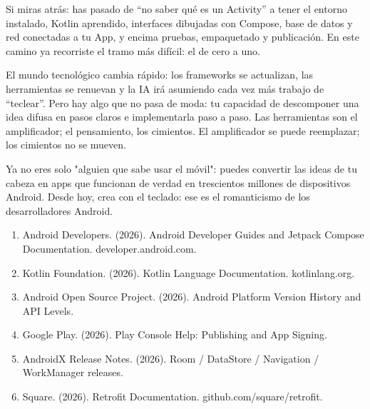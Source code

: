 Si miras atrás: has pasado de “no saber qué es un Activity” a tener el entorno instalado, Kotlin aprendido, interfaces dibujadas con Compose, base de datos y red conectadas a tu App, y encima pruebas, empaquetado y publicación. En este camino ya recorriste el tramo más difícil: el de cero a uno.

El mundo tecnológico cambia rápido: los frameworks se actualizan, las herramientas se renuevan y la IA irá asumiendo cada vez más trabajo de “teclear”. Pero hay algo que no pasa de moda: tu capacidad de descomponer una idea difusa en pasos claros e implementarla paso a paso. Las herramientas son el amplificador; el pensamiento, los cimientos. El amplificador se puede reemplazar; los cimientos no se mueven.

Ya no eres solo "alguien que sabe usar el móvil": puedes convertir las ideas de tu cabeza en apps que funcionan de verdad en trescientos millones de dispositivos Android. Desde hoy, crea con el teclado: ese es el romanticismo de los desarrolladores Android.


\begin{enumerate}
  \item Android Developers. (2026). Android Developer Guides and Jetpack Compose Documentation. developer.android.com.
  \item Kotlin Foundation. (2026). Kotlin Language Documentation. kotlinlang.org.
  \item Android Open Source Project. (2026). Android Platform Version History and API Levels.
  \item Google Play. (2026). Play Console Help: Publishing and App Signing.
  \item AndroidX Release Notes. (2026). Room / DataStore / Navigation / WorkManager releases.
  \item Square. (2026). Retrofit Documentation. github.com/square/retrofit.
\end{enumerate}

